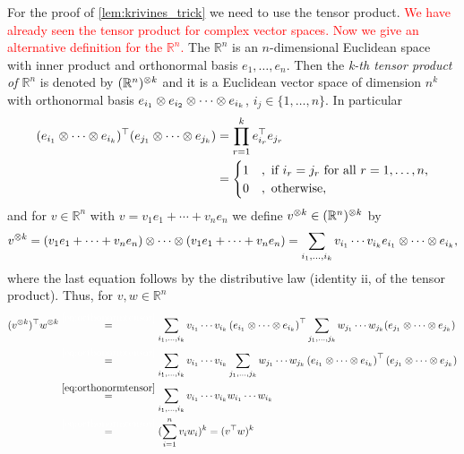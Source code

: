 For the proof of \ref{lem:krivines_trick} we need to use the tensor product. \textcolor{red}{We have already seen the tensor product for complex vector spaces. Now we give an alternative definition for the $\mathbb{R}^n$.} The $\mathbb{R}^n$ is an $n$-dimensional Euclidean space with inner product \sclr{\cdot}{\cdot} and orthonormal basis $e_1,\dots,e_n$.
Then the \emph{k-th tensor product of $\mathbb{R}^n$} is denoted by $(\mathbb{R}^n)^{\otimes k}$ and it is a Euclidean  vector space of dimension $n^k$ with orthonormal basis $e_{i_1}\otimes e_{i_2} \otimes \cdots \otimes e_{i_k}$, $i_j\in\{1,\dots,n\}$. In particular
\begin{align}
	(e_{i_1}\otimes \cdots \otimes e_{i_k})^\top (e_{j_1}\otimes \cdots \otimes e_{j_k}) 
	&= \prod_{r=1}^k e_{i_r}^\top e_{j_r}\nonumber\\
	&=\begin{cases}
		1 & , \text{ if } i_r=j_r \text{ for all } r=1,\dots,n,\\
		0 & , \text{ otherwise},
	\end{cases} \label{eq:orthonormtensor}
\end{align}
and for $v\in\mathbb{R}^n$ with $v=v_1e_1+\cdots +v_ne_n$ we define $v^{\otimes k} \in (\mathbb{R}^n)^{\otimes k}$ by 
\begin{equation}
	v^{\otimes k} = (v_1e_1 + \cdots + v_ne_n) \otimes \cdots \otimes (v_1e_1 + \cdots + v_ne_n) = \sum_{i_1,\dots,i_k} v_{i_1}\cdots v_{i_k} e_{i_1}\otimes\cdots\otimes e_{i_k},
\end{equation}
where the last equation follows by the distributive law (identity ii, of the tensor product). 
Thus, for $v,w\in\mathbb{R}^n$ 
\begin{align}
	(v^{\tensor k})^\top w^{\tensor k}
	&\overset{\textcolor{white}{\eqref*{eq:orthonormtensor}}}{=} \sum_{i_1,\dots,i_k} v_{i_1}\cdots v_{i_k}\left(e_{i_1}\tensor\cdots\tensor e_{i_k}\right)^\top \sum_{j_1,\dots,j_k} w_{j_1}\cdots w_{j_k}(e_{j_1}\tensor\cdots\tensor e_{j_k}) \nonumber\\
	&\overset{\textcolor{white}{\eqref*{eq:orthonormtensor}}}{=} \sum_{i_1,\dots,i_k} v_{i_1}\cdots v_{i_k} \sum_{j_1,\dots,j_k} w_{j_1}\cdots w_{j_k} \left(e_{i_1}\tensor\cdots\tensor e_{i_k}\right)^\top (e_{j_1}\tensor\cdots\tensor e_{j_k}) \nonumber\\
	&\overset{\eqref{eq:orthonormtensor}}{=} \sum_{i_1,\dots,i_k} v_{i_1}\cdots v_{i_k}w_{i_1}\cdots w_{i_k} \nonumber\\
	&\overset{\textcolor{white}{\eqref*{eq:orthonormtensor}}}{=}(\sum_{i=1}^n v_iw_i)^k = (v^\top w)^k \label{eq:kth_tensor}
\end{align}
